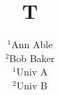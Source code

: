 \documentclass{amsart}
\begin{document}
\title{T}
\author{$^{1}$Ann Able\\ $^{2}$Bob Baker\\ $^{1}$Univ A\\ $^{2}$Univ B}
\maketitle
\end{document}

